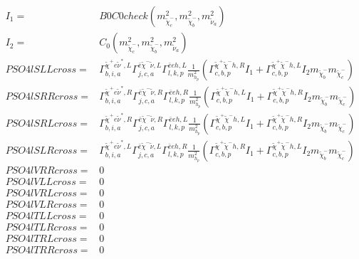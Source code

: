 \documentclass[A4,landscape]{article}
\begin{document}
\begin{align} 
I_1= & B0C0check(m^2_{\tilde{\chi}^-_{{c}}}, m^2_{\tilde{\chi}^-_{{b}}}, m^2_{\tilde{\nu}_{{a}}}) \\ 
I_2= & C_0(m^2_{\tilde{\chi}^-_{{c}}}, m^2_{\tilde{\chi}^-_{{b}}}, m^2_{\tilde{\nu}_{{a}}}) \\ 
  PSO4lSLLcross= &  \Gamma^{\tilde{\chi}^+e \tilde{\nu}^*,L}_{b, i, a} \Gamma^{\bar{e}\tilde{\chi}^- \tilde{\nu} ,L}_{j, c, a} \Gamma^{\bar{e}e h ,L}_{l, k, p} \frac{1}{m^2_{h_{{p}}}} (\Gamma^{\tilde{\chi}^+\tilde{\chi}^- h ,R}_{c, b, p} I_1 + \Gamma^{\tilde{\chi}^+\tilde{\chi}^- h ,L}_{c, b, p} I_2 m_{\tilde{\chi}^-_{{b}}} m_{\tilde{\chi}^-_{{c}}}) \\ 
  PSO4lSRRcross= &  \Gamma^{\tilde{\chi}^+e \tilde{\nu}^*,R}_{b, i, a} \Gamma^{\bar{e}\tilde{\chi}^- \tilde{\nu} ,R}_{j, c, a} \Gamma^{\bar{e}e h ,R}_{l, k, p} \frac{1}{m^2_{h_{{p}}}} (\Gamma^{\tilde{\chi}^+\tilde{\chi}^- h ,L}_{c, b, p} I_1 + \Gamma^{\tilde{\chi}^+\tilde{\chi}^- h ,R}_{c, b, p} I_2 m_{\tilde{\chi}^-_{{b}}} m_{\tilde{\chi}^-_{{c}}}) \\ 
  PSO4lSRLcross= &  \Gamma^{\tilde{\chi}^+e \tilde{\nu}^*,R}_{b, i, a} \Gamma^{\bar{e}\tilde{\chi}^- \tilde{\nu} ,R}_{j, c, a} \Gamma^{\bar{e}e h ,L}_{l, k, p} \frac{1}{m^2_{h_{{p}}}} (\Gamma^{\tilde{\chi}^+\tilde{\chi}^- h ,L}_{c, b, p} I_1 + \Gamma^{\tilde{\chi}^+\tilde{\chi}^- h ,R}_{c, b, p} I_2 m_{\tilde{\chi}^-_{{b}}} m_{\tilde{\chi}^-_{{c}}}) \\ 
  PSO4lSLRcross= &  \Gamma^{\tilde{\chi}^+e \tilde{\nu}^*,L}_{b, i, a} \Gamma^{\bar{e}\tilde{\chi}^- \tilde{\nu} ,L}_{j, c, a} \Gamma^{\bar{e}e h ,R}_{l, k, p} \frac{1}{m^2_{h_{{p}}}} (\Gamma^{\tilde{\chi}^+\tilde{\chi}^- h ,R}_{c, b, p} I_1 + \Gamma^{\tilde{\chi}^+\tilde{\chi}^- h ,L}_{c, b, p} I_2 m_{\tilde{\chi}^-_{{b}}} m_{\tilde{\chi}^-_{{c}}}) \\ 
  PSO4lVRRcross= & 0 \\ 
  PSO4lVLLcross= & 0 \\ 
  PSO4lVRLcross= & 0 \\ 
  PSO4lVLRcross= & 0 \\ 
  PSO4lTLLcross= & 0 \\ 
  PSO4lTLRcross= & 0 \\ 
  PSO4lTRLcross= & 0 \\ 
  PSO4lTRRcross= & 0 \\ 
\end{align} 
\end{document}
